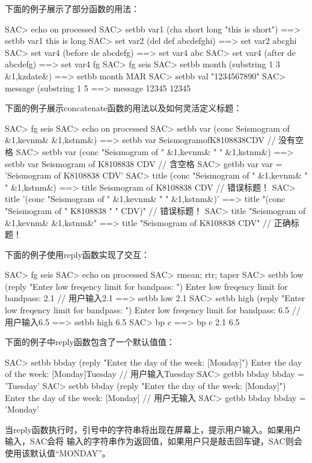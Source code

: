 下面的例子展示了部分函数的用法：
\begin{SACCode}
SAC> echo on processed
SAC> setbb var1 (cha short long "this is short")
 ==>  setbb var1 this is long
SAC> set var2 (del def abcdefghi)
 ==>  set var2 abcghi
SAC> set var4 (before de abcdefg)
 ==>  set var4 abc
SAC> set var4 (after de abcdefg)
 ==>  set var4 fg
SAC> fg seis
SAC> setbb month (substring 1 3 &1,kzdate&)
 ==>  setbb month MAR
SAC> setbb val "1234567890"
SAC> message (substring 1 5 %
 ==>  message 12345
 12345
\end{SACCode}

下面的例子展示concatenate函数的用法以及如何灵活定义标题：
\begin{SACCode}
SAC> fg seis
SAC> echo on processed
SAC> setbb var (conc Seismogram of &1,kevnm& &1,kstnm&)
 ==>  setbb var SeismogramofK8108838CDV                 // 没有空格
SAC> setbb var (conc "Seismogram of " &1,kevnm& " " &1,kstnm&)
 ==>  setbb var Seismogram of K8108838 CDV              // 含空格
SAC> getbb var
 var = 'Seismogram of K8108838 CDV'
SAC> title (conc "Seismogram of " &1,kevnm& " " &1,kstnm&)
 ==>  title Seismogram of K8108838 CDV                  // 错误标题！
SAC> title '(conc "Seismogram of " &1,kevnm& " " &1,kstnm&)'
 ==>  title "(conc "Seismogram of " K8108838 " " CDV)"  // 错误标题！
SAC> title "Seismogram of &1,kevnm& &1,kstnm&"
 ==>  title "Seismogram of K8108838 CDV"                // 正确标题！
\end{SACCode}

下面的例子使用reply函数实现了交互：
\begin{SACCode}
SAC> fg seis
SAC> echo on processed
SAC> rmean; rtr; taper
SAC> setbb low (reply "Enter low freqency limit for bandpass: ")
Enter low freqency limit for bandpass: 2.1          // 用户输入2.1
 ==>  setbb low 2.1
SAC> setbb high (reply "Enter low freqency limit for bandpass: ")
Enter low freqency limit for bandpass: 6.5          // 用户输入6.5
 ==>  setbb high 6.5
SAC> bp c %
 ==>  bp c 2.1 6.5
\end{SACCode}

下面的例子中reply函数包含了一个默认值值：
\begin{SACCode}
SAC> setbb bbday (reply "Enter the day of the week: [Monday]")
Enter the day of the week: [Monday]Tuesday      // 用户输入Tuesday
SAC> getbb bbday
 bbday = 'Tuesday'
SAC> setbb bbday (reply "Enter the day of the week: [Monday]")
Enter the day of the week: [Monday]             // 用户无输入
SAC> getbb bbday
 bbday = 'Monday'
\end{SACCode}
当reply函数执行时，引号中的字符串将出现在屏幕上，提示用户输入。如果用户输入，SAC会将
输入的字符串作为返回值，如果用户只是敲击回车键，SAC则会使用该默认值``MONDAY''。

